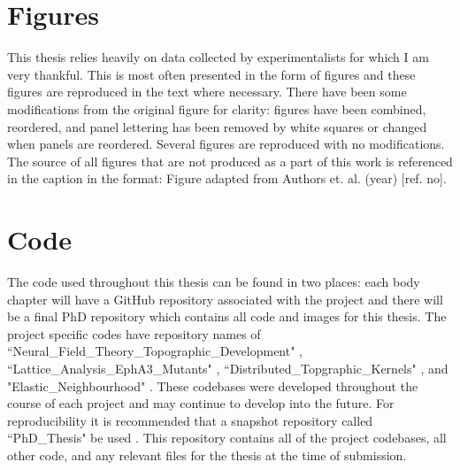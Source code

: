 \section*{Figures}
This thesis relies heavily on data collected by experimentalists for which I am very thankful. This is most often presented in the form of figures and these figures are reproduced in the text where necessary. There have been some modifications from the original figure for clarity: figures have been combined, reordered, and panel lettering has been removed by white squares or changed when panels are reordered. Several figures are reproduced with no modifications. The source of all figures that are not produced as a part of this work is referenced in the caption in the format: Figure adapted from Authors et. al. (year) [ref. no].

\section*{Code}
The code used throughout this thesis can be found in two places: each body chapter will have a GitHub repository associated with the project and there will be a final PhD repository which contains all code and images for this thesis. The project specific codes have repository names of ``Neural\_Field\_Theory\_Topographic\_Development" \cite{NFT}, ``Lattice\_Analysis\_EphA3\_Mutants" \cite{LatticeEphA3}, ``Distributed\_Topgraphic\_Kernels" \cite{DistributedKernels}, and "Elastic\_Neighbourhood" \cite{ElasticNeighbourhood}. These codebases were developed throughout the course of each project and may continue to develop into the future. For reproducibility it is recommended that a snapshot repository called ``PhD\_Thesis" be used \cite{ThesisRepo}. This repository  contains all of the project codebases, all other code, and any relevant files for the thesis at the time of submission.